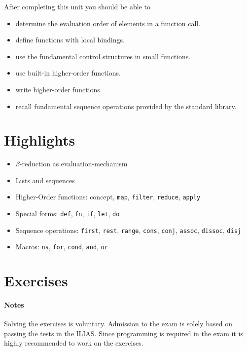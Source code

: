 \documentclass[11pt,a4paper]{article}
\begin{document}
After completing this unit you should be able to

\begin{itemize}
	\item determine the evaluation order of elements in a function call.
    \item define functions with local bindings.
    \item use the fundamental control structures in small functions.
    \item use built-in higher-order functions.
    \item write higher-order functions.
    \item recall fundamental sequence operations provided by the standard library.
\end{itemize}

\section{Highlights}

\begin{itemize}
    \item $\beta$-reduction as evaluation-mechanism
    \item Lists and sequences
    \item Higher-Order functions: concept, \verb|map|, \verb|filter|, \verb|reduce|, \verb|apply|
    \item Special forms: \verb|def|, \verb|fn|, \verb|if|, \verb|let|, \verb|do|
    \item Sequence operations: \verb|first|, \verb|rest|, \verb|range|, \verb|cons|, \verb|conj|, \verb|assoc|, \verb|dissoc|, \verb|disj|
    \item Macros: \verb|ns|, \verb|for|, \verb|cond|, \verb|and|, \verb|or|
\end{itemize}



\section{Exercises}

\paragraph{Notes}
Solving the exercises is voluntary.
Admission to the exam is solely based on passing the tests in the ILIAS.
Since programming is required in the exam
it is highly recommended to work on the exercises.
\end{document}
